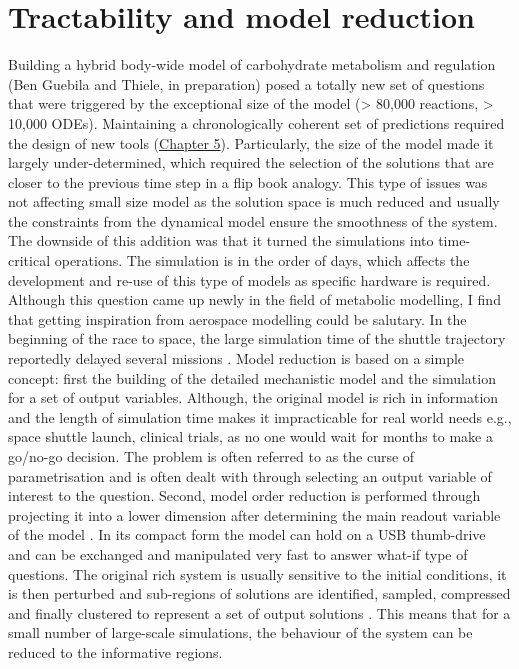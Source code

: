 \section{Tractability and model reduction}
Building a hybrid body-wide model of carbohydrate metabolism and regulation (Ben Guebila and Thiele, in preparation) posed a totally new set of questions that were triggered by the exceptional size of the model (> 80,000 reactions, > 10,000 ODEs). Maintaining a chronologically coherent set of predictions required the design of new tools (\hyperref[ch:chapter5]{Chapter 5}). Particularly, the size of the model made it largely under-determined, which required the selection of the solutions that are closer to the previous time step in a flip book analogy. This type of issues was not affecting small size model as the solution space is much reduced and usually the constraints from the dynamical model ensure the smoothness of the system. The downside of this addition was that it turned the simulations into time-critical operations. The simulation is in the order of days, which affects the development and re-use of this type of models as specific hardware is required.\\
Although this question came up newly in the field of metabolic modelling, I find that getting inspiration from aerospace modelling could be salutary. In the beginning of the race to space, the large simulation time of the shuttle trajectory reportedly delayed several missions \cite{phillips2005journey}.
Model reduction is based on a simple concept: first the building of the detailed mechanistic model and the simulation for a set of output variables. Although, the original model is rich in information and the length of simulation time makes it impracticable for real world needs e.g., space shuttle launch, clinical trials, as no one would wait for months to make a go/no-go decision. The problem is often referred to as the curse of parametrisation and is often dealt with through selecting an output variable of interest to the question. Second, model order reduction is performed through projecting it into a lower dimension after determining the main readout variable of the model \cite{zahr2017multilevel,amsallem2016real}. In its compact form the model can hold on a USB thumb-drive and can be exchanged and manipulated very fast to answer what-if type of questions.
The original rich system is usually sensitive to the initial conditions, it is then perturbed and sub-regions of solutions are identified, sampled, compressed and finally clustered to represent a set of output solutions \cite{balajewicz2016projection,farhat2016recent}. This means that for a small number of large-scale simulations, the behaviour of the system can be reduced to the informative regions.
